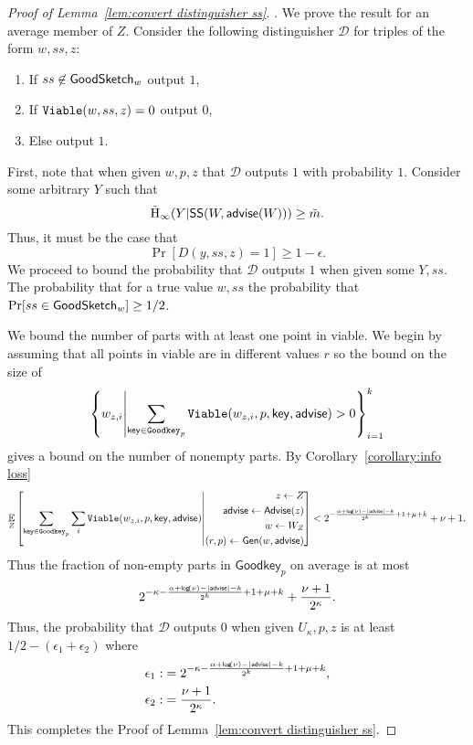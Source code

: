 \begin{proof}[Proof of Lemma~\ref{lem:convert distinguisher ss}].
We prove the result for an average member of $Z$.  Consider the following distinguisher $\mathcal{D}$ for triples of the form $w, ss, z$:
\begin{enumerate}
\item If $ss \not\in \mathsf{GoodSketch}_w$ output $1$,
\item If $\mathtt{Viable}(w, ss, z) =0 $ output $0$,
\item Else output $1$.
\end{enumerate}
First, note that when given $w, p, z$ that $\mathcal{D}$ outputs $1$ with probability $1$.  Consider some arbitrary $Y$ such that \[\tilde{\mathrm{H}}_\infty(Y | {\mathsf{SS}}(W, {\mathsf{advise}}(W)))\ge \tilde{m}.\]
Thus, it must be the case that 
\[
\Pr[D(y, ss, z) = 1] \ge 1- \epsilon.
\]
We proceed to bound the probability that $\mathcal{D}$ outputs $1$ when given some $Y, ss$.  The probability that for a true value $w, ss$ the probability that $\Pr[ss\in \mathsf{GoodSketch}_w] \ge 1/2$. 



We bound the number of parts with at least one point in viable.  We begin by assuming that all points in viable are in different  values $r$ so the bound on the size of 
\[
\left\{w_{z, i} \middle|\sum_{\mathsf{key}\in\mathtt{Goodkey}_p} \mathtt{Viable}(w_{z,i}, p, \mathsf{key}, {\mathsf{advise}})>0\right\}_{i=1}^k 
\] 
gives a bound on the number of nonempty parts. By Corollary~\ref{corollary:info loss} 
\[
\operatorname*{\mathbb{E}}_{Z} \left[\sum_{\mathsf{key} \in \mathtt{Goodkey}_p}\sum_{i }  \mathtt{Viable}(w_{z,i}, p, \mathsf{key}, {\mathsf{advise}}) \middle| \begin{aligned} z\leftarrow Z\\ {\mathsf{advise}}\leftarrow {\ensuremath{\mathsf{Advise}}}(z)\\w\leftarrow W_Z\\(r, p)\leftarrow {\ensuremath{\mathsf{Gen}}}(w, {\mathsf{advise}})\end{aligned} \right]< 2^{-\frac{\alpha+\mathsf{log}\!\left(\nu\right)-|{\mathsf{advise}}|-k}{2^k}+1+\mu+k}+\nu+1.
\]
Thus the fraction of non-empty parts in $\mathsf{Goodkey}_p$ on average is at most 
\[
2^{-\kappa-\frac{\alpha+\mathsf{log}\!\left(\nu\right)-|{\mathsf{advise}}|-k}{2^k}+1+\mu+k}+\frac{\nu+1}{2^\kappa}.
\]
Thus, the probability that $\mathcal{D}$ outputs $0$ when given $U_\kappa, p, z$ is at least 
$1/2-(\epsilon_1+\epsilon_2)$
where 
\begin{align*}
\epsilon_1:&=2^{-\kappa-\frac{\alpha+\mathsf{log}\!\left(\nu\right)-|{\mathsf{advise}}|-k}{2^k}+1+\mu+k},\\
\epsilon_2:&=\frac{\nu+1}{2^{\kappa}}.
\end{align*}
\noindent
This completes the Proof of Lemma~\ref{lem:convert distinguisher ss}.
\end{proof}






